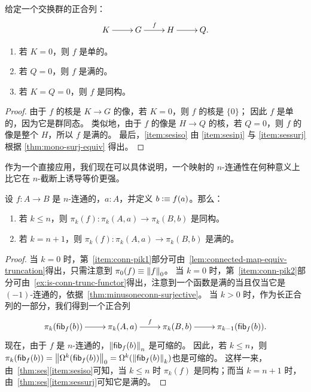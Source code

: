 \begin{lem}\label{thm:ses}
  给定一个交换群的正合列：
  \[\xymatrix{K \ar[r]& G \ar^f[r] & H \ar[r] & Q.}\]
  \begin{enumerate}
  \item 若 $K=0$，则 $f$ 是单的。\label{item:sesinj}
  \item 若 $Q=0$，则 $f$ 是满的。\label{item:sessurj}
  \item 若 $K=Q=0$，则 $f$ 是同构。\label{item:sesiso}
  \end{enumerate}
\end{lem}

\begin{proof}
  由于 $f$ 的核是 $K\to G$ 的像，若 $K=0$，则 $f$ 的核是 $\{0\}$；
  因此 $f$ 是单的，因为它是群同态。
  类似地，由于 $f$ 的像是 $H\to Q$ 的核，若 $Q=0$，则 $f$ 的像是整个 $H$，所以 $f$ 是满的。
  最后，\ref{item:sesiso} 由 \ref{item:sesinj} 与 \ref{item:sessurj} 根据 \cref{thm:mono-surj-equiv} 得出。
\end{proof}

作为一个直接应用，我们现在可以具体说明，一个映射的 $n$-连通性在何种意义上比它在 $n$-截断上诱导等价更强。

\begin{cor}\label{thm:conn-pik}
  设 $f:A\to B$ 是 $n$-连通的，$a:A$，并定义 $b\defeq f(a)$。那么：
  \begin{enumerate}
  \item 若 $k\le n$，则 $\pi_k(f):\pi_k(A,a) \to \pi_k(B,b)$ 是同构。\label{item:conn-pik1}
  \item 若 $k=n+1$，则 $\pi_k(f):\pi_k(A,a) \to \pi_k(B,b)$ 是满的。\label{item:conn-pik2}
  \end{enumerate}
\end{cor}

\begin{proof}
  当 $k=0$ 时，第~\ref{item:conn-pik1}部分可由~\cref{lem:connected-map-equiv-truncation}得出，只需注意到 $\pi_0(f)\equiv\trunc 0f$。
  当 $k=0$ 时，第~\ref{item:conn-pik2}部分可由~\cref{ex:is-conn-trunc-functor}得出，注意到一个函数是满的当且仅当它是 $(-1)$-连通的，依据~\cref{thm:minusoneconn-surjective}。
  当 $k>0$ 时，作为长正合列的一部分，我们得到一个正合列
  \[\xymatrix{\pi_k(\hfib f b) \ar[r]& \pi_k(A,a) \ar^f[r] & \pi_k(B,b) \ar[r] & \pi_{k-1}(\hfib f b).}\]
  现在，由于 $f$ 是 $n$-连通的，$\trunc n{\hfib f b}$ 是可缩的。
  因此，若 $k\le n$，则~$\pi_k(\hfib f b) = \trunc0{\Omega^k(\hfib f b)} = \Omega^k(\trunc k{\hfib f b})$也是可缩的。
  这样一来，由~\cref{thm:ses}\ref{item:sesiso}可知，当 $k\le n$ 时 $\pi_k(f)$ 是同构；而当 $k=n+1$ 时，由~\cref{thm:ses}\ref{item:sessurj}可知它是满的。
\end{proof}

